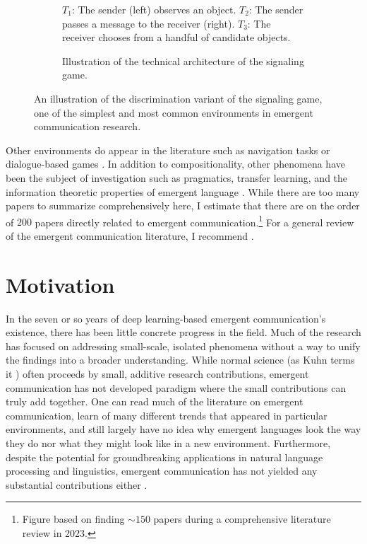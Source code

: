 \begin{figure}
  \centering
  \begin{subfigure}[b]{0.53\textwidth}
    \centering
    \setlength\fboxsep{0pt}
    
    \vspace{1cm}
    \caption{%
      $T_1$: The sender (left) observes an object.
      $T_2$: The sender passes a message to the receiver (right).
      $T_3$: The receiver chooses from a handful of candidate objects.
    }
    \unskip\label{fig:boxface}
  \end{subfigure}
  \hfill
  \begin{subfigure}[b]{0.45\textwidth}
    \centering
    
    \caption{Illustration of the technical architecture of the signaling game.}
    \unskip\label{fig:signaling-chart}
  \end{subfigure}
  \caption{%
    An illustration of the discrimination variant of the signaling game, one of the simplest and most common environments in emergent communication research.
  }
  \unskip\label{fig:signaling-game}
\end{figure}


Other environments do appear in the literature such as navigation tasks or dialogue-based games
  \citep{unger2020GeneralizingEC,brandizzi2022rlupus}.
In addition to compositionality, other phenomena have been the subject of investigation such as pragmatics, transfer learning, and the information theoretic properties of emergent language
  \citep{kang2020incorporatingpragmaticreasoningcommunication,yao2022linking,tucker2021discrete}.
While there are too many papers to summarize comprehensively here, I estimate that there are on the order of $200$ papers directly related to emergent communication.\footnote{Figure based on finding ${\sim}150$ papers during a comprehensive literature review in 2023.}
For a general review of the emergent communication literature, I recommend \citet{lazaridou2020review}.

\section{Motivation}

In the seven or so years of deep learning-based emergent communication's existence, there has been little concrete progress in the field.
Much of the research has focused on addressing small-scale, isolated phenomena without a way to unify the findings into a broader understanding.
While normal science (as Kuhn terms it \citep{kuhn}) often proceeds by small, additive research contributions, emergent communication has not developed paradigm where the small contributions can truly add together.
One can read much of the literature on emergent communication, learn of many different trends that appeared in particular environments, and still largely have no idea why emergent languages look the way they do nor what they might look like in a new environment.
Furthermore, despite the potential for groundbreaking applications in natural language processing and linguistics, emergent communication has not yielded any substantial contributions either \citep{boldt2024review}.

